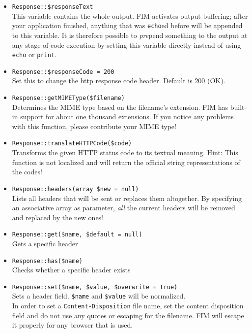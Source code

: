 \documentclass{scrartcl}
\begin{document}
      \begin{itemize}
         \item \lstinline!Response::$responseText! \\
            This variable contains the whole output. FIM activates output buffering; after your application finished, anything that was \lstinline!echo!ed before will be appended to this variable. It is therefore possible to \emph{pre}pend something to the output at any stage of code execution by setting this variable directly instead of using \lstinline!echo! or \lstinline!print!.
         \item \lstinline!Response::$responseCode = 200! \\
            Set this to change the http response code header. Default is $200$ (OK).
         \item \lstinline!Response::getMIMEType($filename)! \\
            Determines the MIME type based on the filename's extension. FIM has built-in support for about one thousand extensions. If you notice any problems with this function, please contribute your MIME type!
         \item \lstinline!Response::translateHTTPCode($code)! \\
            Transforms the given HTTP status code to its textual meaning. Hint: This function is not localized and will return the official string representations of the codes!
         \item \lstinline!Response::headers(array $new = null)! \\
            Lists all headers that will be sent or replaces them altogether. By specifying an associative array as parameter, \emph{all} the current headers will be removed and replaced by the new ones!
         \item \lstinline!Response::get($name, $default = null)! \\
            Gets a specific header
         \item \lstinline!Response::has($name)! \\
            Checks whether a specific header exists
         \item \lstinline!Response::set($name, $value, $overwrite = true)! \\
            Sets a header field. \lstinline!$name! and \lstinline!$value! will be normalized. \\
            In order to set a \texttt{Content-Disposition} file name, set the content disposition field and do not use any quotes or escaping for the filename. FIM will escape it properly for any browser that is used.

\end{itemize}
\end{document}
